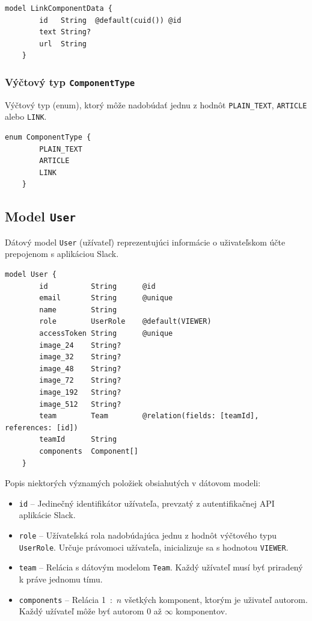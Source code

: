 \begin{lstlisting}[caption=Dátový model \texttt{LinkComponentData} v konfiguračnom súbore \texttt{prisma}.]
	model LinkComponentData {
		id   String  @default(cuid()) @id
		text String?
		url  String
	}
\end{lstlisting}

\subsubsection{Výčtový typ \texttt{ComponentType}}
Výčtový typ (enum), ktorý môže nadobúdať jednu z hodnôt \texttt{PLAIN\_TEXT}, \texttt{ARTICLE} alebo \texttt{LINK}. \\

\begin{lstlisting}[caption=Výčtový typ \texttt{ComponentType} v konfiguračnom súbore \texttt{prisma}.]
	enum ComponentType {
		PLAIN_TEXT
		ARTICLE
		LINK
	}
\end{lstlisting}

\subsection{Model \texttt{User}}
Dátový model \texttt{User} (užívateľ) reprezentujúci informácie o uživateľskom účte prepojenom s aplikáciou Slack. \\

\begin{lstlisting}[caption=Dátový model \texttt{User} v konfiguračnom súbore \texttt{prisma}.]
	model User {
		id          String      @id
		email       String      @unique
		name        String
		role        UserRole    @default(VIEWER)
		accessToken String      @unique
		image_24    String?
		image_32    String?
		image_48    String?
		image_72    String?
		image_192   String?
		image_512   String?
		team        Team        @relation(fields: [teamId], references: [id])
		teamId      String
		components  Component[]
	}
\end{lstlisting}

\medskip

\noindent Popis niektorých významých položiek obsiahutých v dátovom modeli:

\begin{itemize}
	\item \texttt{id} -- Jedinečný identifikátor užívateľa, prevzatý z autentifikačnej API aplikácie Slack.
	\item \texttt{role} -- Užívateľská rola nadobúdajúca jednu z hodnôt výčtového typu \texttt{UserRole}. Určuje právomoci užívateľa, inicializuje sa s hodnotou \texttt{VIEWER}.
	\item \texttt{team} -- Relácia s dátovým modelom \texttt{Team}. Každý užívateľ musí byť priradený k práve jednomu tímu.
	\item \texttt{components} -- Relácia 1~:~$n$ všetkých komponent, ktorým je uživateľ autorom. Každý užívateľ môže byť autorom 0 až $\infty$ komponentov.
\end{itemize}

